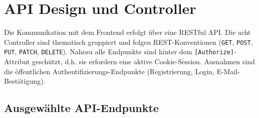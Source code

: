 \section{API Design und Controller}
Die Kommunikation mit dem Frontend erfolgt \"uber eine RESTful API. Die acht Controller sind thematisch gruppiert und folgen REST-Konventionen (\texttt{GET}, \texttt{POST}, \texttt{PUT}, \texttt{PATCH}, \texttt{DELETE}). Nahezu alle Endpunkte sind hinter dem \texttt{[Authorize]}-Attribut gesch\"utzt, d.h. sie erfordern eine aktive Cookie-Session. Ausnahmen sind die \"offentlichen Authentifizierungs-Endpunkte (Registrierung, Login, E-Mail-Best\"atigung).

\subsection{Ausgew\"ahlte API-Endpunkte}

